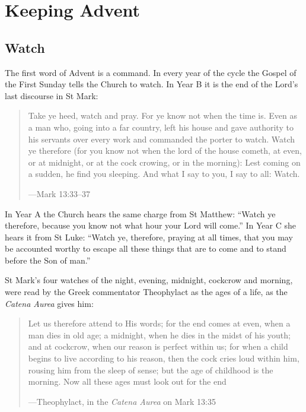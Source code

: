 \section{Keeping Advent}

\subsection{Watch}\label{sec:watch}

The first word of Advent is a command. In every year of the cycle the Gospel of
the First Sunday tells the Church to watch. In Year B it is the end of the Lord's last discourse in St Mark:

\begin{quote}
Take ye heed, watch and pray. For ye know not when the time is. Even as a man
who, going into a far country, left his house and gave authority to his servants
over every work and commanded the porter to watch. Watch ye therefore (for you
know not when the lord of the house cometh, at even, or at midnight, or at the
cock crowing, or in the morning): Lest coming on a sudden, he find you sleeping.
And what I say to you, I say to all: Watch.\par
{\smallskip\noindent\small ---Mark 13:33--37\par}
\end{quote}

\noindent In Year A the Church hears the same charge from St Matthew: ``Watch ye
therefore, because you know not what hour your Lord will come.'' In Year C she
hears it from St Luke: ``Watch ye, therefore, praying at all times, that you may
be accounted worthy to escape all these things that are to come and to stand
before the Son of man.''

St Mark's four watches of the night, evening, midnight, cockcrow and morning,
were read by the Greek commentator Theophylact as the ages of a life, as the
\emph{Catena Aurea} gives him:

\begin{quote}
Let us therefore attend to His words; for the end comes at even, when a man dies
in old age; a midnight, when he dies in the midst of his youth; and at cockcrow,
when our reason is perfect within us; for when a child begins to live according
to his reason, then the cock cries loud within him, rousing him from the sleep
of sense; but the age of childhood is the morning. Now all these ages must look
out for the end\par
{\smallskip\noindent\small ---Theophylact, in the \emph{Catena Aurea} on Mark 13:35\par}
\end{quote}

